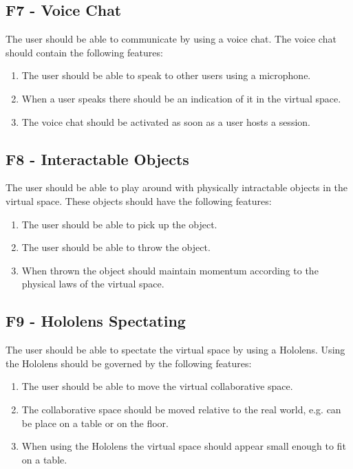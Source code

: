         \subsection{F7 - Voice Chat}
        The user should be able to communicate by using a voice chat. The voice chat should contain the following features:
        \begin{enumerate}
            \item The user should be able to speak to other users using a microphone.
            \item When a user speaks there should be an indication of it in the virtual space.
            \item The voice chat should be activated as soon as a user hosts a session.
        \end{enumerate}
        
        \subsection{F8 - Interactable Objects}
        The user should be able to play around with physically intractable objects in the virtual space. These objects should have the following features:
        \begin{enumerate}
            \item The user should be able to pick up the object.
            \item The user should be able to throw the object.
            \item When thrown the object should maintain momentum according to the physical laws of the virtual space.
        \end{enumerate}
        
        \subsection{F9 - Hololens Spectating}
        The user should be able to spectate the virtual space by using a Hololens. Using the Hololens should be governed by the following features:
        \begin{enumerate}
            \item The user should be able to move the virtual collaborative space.
            \item The collaborative space should be moved relative to the real world, e.g. can be place on a table or on the floor.
            \item When using the Hololens the virtual space should appear small enough to fit on a table.
        \end{enumerate}
    
